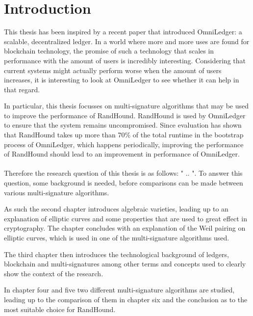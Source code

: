 \documentclass[12pt]{report}
\begin{document}
	\chapter{Introduction}
	This thesis has been inspired by a recent paper that introduced OmniLedger\cite{omniledger}: a scalable, decentralized ledger. In a world where more and more uses are found for blockchain technology, the promise of such a technology that scales in performance with the amount of users is incredibly interesting. Considering that current systems might actually perform worse when the amount of users increases, it is interesting to look at OmniLedger to see whether it can help in that regard.
	
	In particular, this thesis focusses on multi-signature algorithms that may be used to improve the performance of RandHound\cite{randhound}. RandHound is used by OmniLedger to ensure that the system remains uncompromised. Since evaluation has shown that RandHound takes up more than 70\% of the total runtime in the bootstrap process of OmniLedger\cite{omniledger}, which happens periodically, improving the performance of RandHound should lead to an improvement in performance of OmniLedger.
	\\
	\\
	Therefore the research question of this thesis is as follows: " .. ". To answer this question, some background is needed, before comparisons can be made between various multi-signature algorithms.
	
	As such the second chapter introduces algebraic varieties, leading up to an explanation of elliptic curves and some properties that are used to great effect in cryptography. The chapter concludes with an explanation of the Weil pairing on elliptic curves, which is used in one of the multi-signature algorithms used.
	
	The third chapter then introduces the technological background of ledgers, blockchain and multi-signatures among other terms and concepts used to clearly show the context of the research.
	
	In chapter four and five two different multi-signature algorithms are studied, leading up to the comparison of them in chapter six and the conclusion as to the most suitable choice for RandHound.
\end{document}
